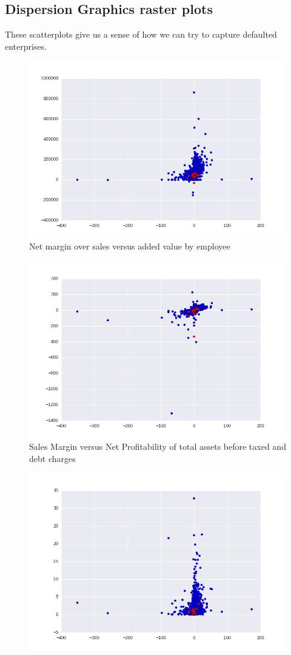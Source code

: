 \documentclass[DIV=calc, paper=a4, fontsize=11pt, twocolumn]{scrartcl}
\begin{document}
\begin{appendices}
\section{Dispersion Graphics raster plots}
These scatterplots give us a sense of how we can try to capture defaulted enterprises.
\begin{figure}[h]
\centering
    \includegraphics[width=0.8\linewidth]{cr2xr4.png}
    \caption{Net margin over sales versus added value by employee}
\end{figure}  
\begin{figure}[h]
  \centering
  \includegraphics[width=0.8\linewidth]{cr2xr12.png}
  \caption{Sales Margin versus Net Profitability of total assets before taxed and debt charges}
\end{figure}
\begin{figure}[h]
  \centering
  \includegraphics[width=0.8\linewidth]{cr2xr14.png}

\end{figure}
\end{appendices}
\end{document}
